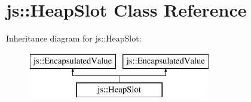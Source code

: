 \hypertarget{classjs_1_1_heap_slot}{\section{js\-:\-:Heap\-Slot Class Reference}
\label{classjs_1_1_heap_slot}
}
Inheritance diagram for js\-:\-:Heap\-Slot\-:\begin{figure}[H]
\begin{center}
\leavevmode
\includegraphics[height=2.000000cm]{classjs_1_1_heap_slot}
\end{center}
\end{figure}
